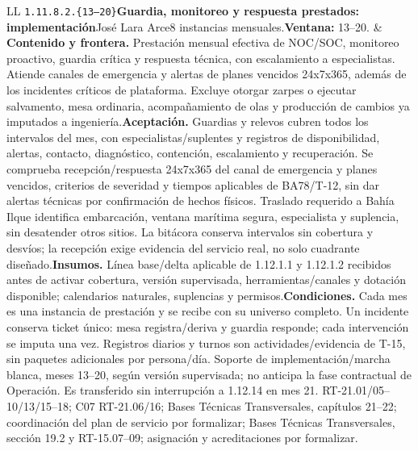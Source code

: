 \begin{longtable}{L{\tabcolsep\relax}L{\tabcolsep\relax}}
\texttt{1.\allowbreak{}11.\allowbreak{}8.\allowbreak{}2.\allowbreak{}\{13--20\}}\newline{}\textbf{Guardia, monitoreo y respuesta prestados: implementación}\newline{}José Lara Arce\newline{}8 instancias mensuales.\newline{}\textbf{Ventana:} 13--20. & \textbf{Contenido y frontera.} Prestación mensual efectiva de NOC/SOC, monitoreo proactivo, guardia crítica y respuesta técnica, con escalamiento a especialistas. Atiende canales de emergencia y alertas de planes vencidos 24x7x365, además de los incidentes críticos de plataforma. Excluye otorgar zarpes o ejecutar salvamento, mesa ordinaria, acompañamiento de olas y producción de cambios ya imputados a ingeniería.\newline{}\textbf{Aceptación.} Guardias y relevos cubren todos los intervalos del mes, con especialistas/suplentes y registros de disponibilidad, alertas, contacto, diagnóstico, contención, escalamiento y recuperación. Se comprueba recepción/respuesta 24x7x365 del canal de emergencia y planes vencidos, criterios de severidad y tiempos aplicables de BA78/T-12, sin dar alertas técnicas por confirmación de hechos físicos. Traslado requerido a Bahía Ilque identifica embarcación, ventana marítima segura, especialista y suplencia, sin desatender otros sitios. La bitácora conserva intervalos sin cobertura y desvíos; la recepción exige evidencia del servicio real, no solo cuadrante diseñado.\newline{}\textbf{Insumos.} Línea base/delta aplicable de 1.12.1.1 y 1.12.1.2 recibidos antes de activar cobertura, versión supervisada, herramientas/canales y dotación disponible; calendarios naturales, suplencias y permisos.\newline{}\textbf{Condiciones.} Cada mes es una instancia de prestación y se recibe con su universo completo. Un incidente conserva ticket único: mesa registra/deriva y guardia responde; cada intervención se imputa una vez. Registros diarios y turnos son actividades/evidencia de T-15, sin paquetes adicionales por persona/día. Soporte de implementación/marcha blanca, meses 13--20, según versión supervisada; no anticipa la fase contractual de Operación. Es transferido sin interrupción a 1.12.14 en mes 21. RT-21.01/05--10/13/15--18; C07 RT-21.06/16; Bases Técnicas Transversales, capítulos 21--22; coordinación del plan de servicio por formalizar; Bases Técnicas Transversales, sección 19.2 y RT-15.07--09; asignación y acreditaciones por formalizar.\\\hline
\end{longtable}\endgroup
